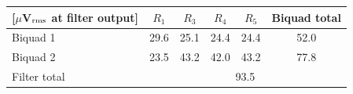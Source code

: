 \begin{tabular}{lccccc}
\toprule
{[$\mu$V$_{\rm rms}$ at filter output]} & $R_1$ & $R_3$ & $R_4$ & $R_5$ & Biquad total \\
\midrule
Biquad 1 & 29.6 & 25.1 & 24.4 & 24.4 & 52.0 \\
Biquad 2 & 23.5 & 43.2 & 42.0 & 43.2 & 77.8 \\
\midrule
Filter total & \multicolumn{5}{c}{93.5} \\
\bottomrule
\end{tabular}